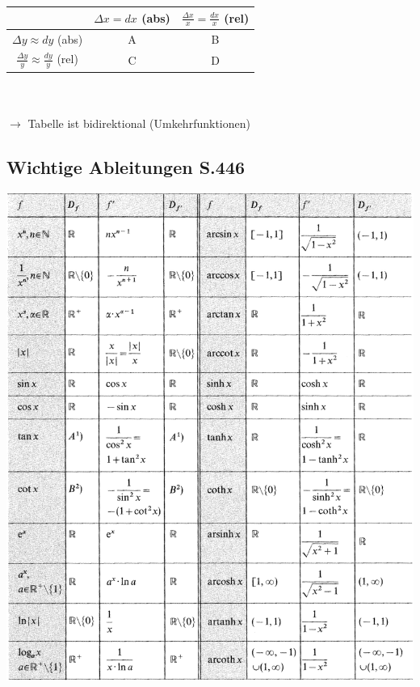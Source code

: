 			\begin{tabular}{| c | c | c |}
			\hline
			& $\Delta x = dx$ (abs) & $\frac{\Delta x}{x} = \frac{dx}{x}$ (rel)  \\
			\hline
			$\Delta y \approx dy$ (abs) & A & B \\
			\hline
			$\frac{\Delta y}{y} \approx \frac{dy}{y}$ (rel) & C & D \\
			\hline
			\end{tabular}					
			\\ \\
			$\rightarrow$ Tabelle ist bidirektional (Umkehrfunktionen)
			
			
			\subsection{Wichtige Ableitungen S.446}
			
			\includegraphics[width=\linewidth]{Bilder/ableitungen}

			
